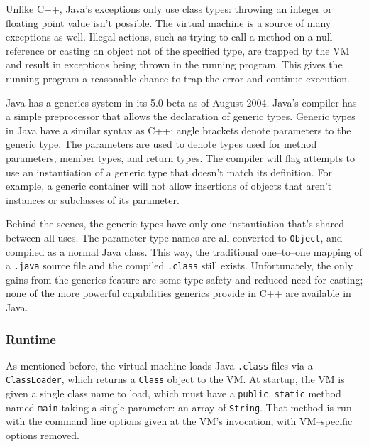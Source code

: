 	Unlike C++, Java's exceptions only use class types: throwing an integer or floating point value isn't possible.  The virtual machine is a source of many exceptions as well.  Illegal actions, such as trying to call a method on a null reference or casting an object not of the specified type, are trapped by the VM and result in exceptions being thrown in the running program.  This gives the running program a reasonable chance to trap the error and continue execution.

  Java has a generics system in its 5.0 beta as of August 2004\cite{java-generics}.  Java's compiler has a simple preprocessor that allows the declaration of generic types.  Generic types in Java have a similar syntax as C++: angle brackets denote parameters to the generic type.  The parameters are used to denote types used for method parameters, member types, and return types.  The compiler will flag attempts to use an instantiation of a generic type that doesn't match its definition.  For example, a generic container will not allow insertions of objects that aren't instances or subclasses of its parameter.

  Behind the scenes, the generic types have only one instantiation that's shared between all uses.  The parameter type names are all converted to \texttt{Object}, and compiled as a normal Java class.  This way, the traditional one--to--one mapping of a \texttt{.java} source file and the compiled \texttt{.class} still exists.  Unfortunately, the only gains from the generics feature are some type safety and reduced need for casting; none of the more powerful capabilities generics provide in C++ are available in Java.


\subsubsection{Runtime}
	As mentioned before, the virtual machine loads Java \texttt{.class} files via a \texttt{ClassLoader}, which returns a \texttt{Class} object to the VM.  At startup, the VM is given a single class name to load, which must have a \texttt{public}, \texttt{static} method named \texttt{main} taking a single parameter: an array of \texttt{String}.  That method is run with the command line options given at the VM's invocation, with VM--specific options removed.

